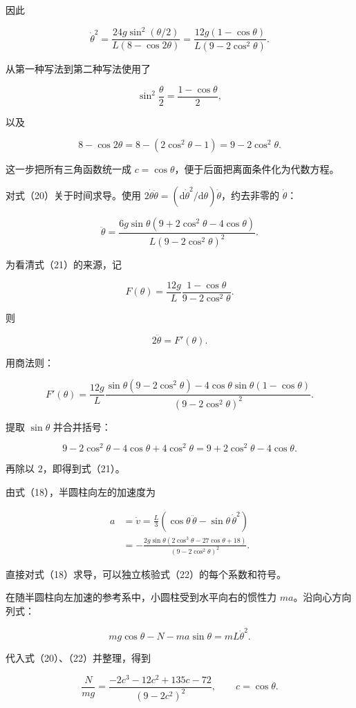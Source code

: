 \documentclass[12pt,a4paper,UTF8]{ctexart}
\begin{document}
因此

\[\boxed{
\dot\theta^2
=\frac{24g\sin^2(\theta/2)}{L(8-\cos2\theta)}
=\frac{12g(1-\cos\theta)}{L(9-2\cos^2\theta)}
}. \tag{20}\]

从第一种写法到第二种写法使用了

\[\sin^2\frac\theta2=\frac{1-\cos\theta}{2},\]

以及

\[8-\cos2\theta
=8-(2\cos^2\theta-1)
=9-2\cos^2\theta.\]

这一步把所有三角函数统一成
\(c=\cos\theta\)，便于后面把离面条件化为代数方程。

对式（20）关于时间求导。使用
\(2\dot\theta\ddot\theta=(\mathrm d\dot\theta^2/\mathrm d\theta)\dot\theta\)，约去非零的
\(\dot\theta\)：

\[\boxed{
\ddot\theta
=\frac{6g\sin\theta(9+2\cos^2\theta-4\cos\theta)}
{L(9-2\cos^2\theta)^2}
}. \tag{21}\]

为看清式（21）的来源，记

\[F(\theta)=\frac{12g}{L}
\frac{1-\cos\theta}{9-2\cos^2\theta}.\]

则

\[2\ddot\theta=F'(\theta).\]

用商法则：

\[F'(\theta)=\frac{12g}{L}
\frac{\sin\theta(9-2\cos^2\theta)
-4\cos\theta\sin\theta(1-\cos\theta)}
{(9-2\cos^2\theta)^2}.\]

提取 \(\sin\theta\) 并合并括号：

\[9-2\cos^2\theta-4\cos\theta+4\cos^2\theta
=9+2\cos^2\theta-4\cos\theta.\]

再除以 \(2\)，即得到式（21）。

由式（18），半圆柱向左的加速度为

\[\begin{aligned}
a
&=\dot v
=\frac{L}{3}\left(\cos\theta\,\ddot\theta
-\sin\theta\,\dot\theta^2\right)\\
&=-\frac{2g\sin\theta(2\cos^3\theta-27\cos\theta+18)}
{(9-2\cos^2\theta)^2}.
\end{aligned} \tag{22}\]

直接对式（18）求导，可以独立核验式（22）的每个系数和符号。

在随半圆柱向左加速的参考系中，小圆柱受到水平向右的惯性力
\(ma\)。沿向心方向列式：

\[mg\cos\theta-N-ma\sin\theta=mL\dot\theta^2. \tag{23}\]

代入式（20）、（22）并整理，得到

\[\frac{N}{mg}
=\frac{-2c^3-12c^2+135c-72}{(9-2c^2)^2},
\qquad c=\cos\theta. \tag{24}\]
\end{document}
